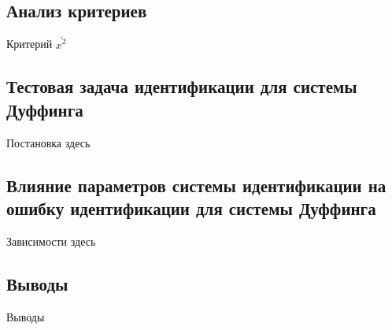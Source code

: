
\subsection{Анализ критериев}  %

Критерий
$\overline{x^2}$



\subsection{Тестовая задача идентификации для системы Дуффинга}  %

Постановка здесь


\subsection{Влияние параметров системы идентификации на ошибку идентификации для системы Дуффинга}  %


Зависимости здесь


\subsection{Выводы}  %

Выводы



